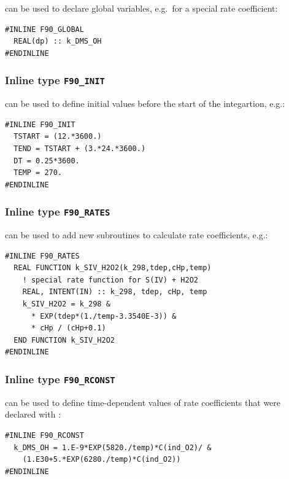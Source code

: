 \documentclass[twoside]{article}
\begin{document}
 can be used to declare global variables, e.g.\ for a
special rate coefficient:
%
\begin{verbatim}
#INLINE F90_GLOBAL
  REAL(dp) :: k_DMS_OH
#ENDINLINE
\end{verbatim}

\subsubsection{Inline type {\tt F90\_INIT}}
\label{sec:f90-init}

 can be used to define initial values before the start of
the integartion, e.g.:
%
\begin{verbatim}
#INLINE F90_INIT
  TSTART = (12.*3600.)
  TEND = TSTART + (3.*24.*3600.)
  DT = 0.25*3600.
  TEMP = 270.
#ENDINLINE
\end{verbatim}

\subsubsection{Inline type {\tt F90\_RATES}}
\label{sec:f90-rates}

 can be used to add new subroutines to calculate rate
coefficients, e.g.:
%
\begin{verbatim}
#INLINE F90_RATES
  REAL FUNCTION k_SIV_H2O2(k_298,tdep,cHp,temp)
    ! special rate function for S(IV) + H2O2
    REAL, INTENT(IN) :: k_298, tdep, cHp, temp
    k_SIV_H2O2 = k_298 &
      * EXP(tdep*(1./temp-3.3540E-3)) &
      * cHp / (cHp+0.1)
  END FUNCTION k_SIV_H2O2
#ENDINLINE
\end{verbatim}

\subsubsection{Inline type {\tt F90\_RCONST}}
\label{sec:f90-rconst}

 can be used to define time-dependent values of rate
coefficients that were declared with :
%
\begin{verbatim}
#INLINE F90_RCONST
  k_DMS_OH = 1.E-9*EXP(5820./temp)*C(ind_O2)/ &
    (1.E30+5.*EXP(6280./temp)*C(ind_O2))
#ENDINLINE
\end{verbatim}
\end{document}
